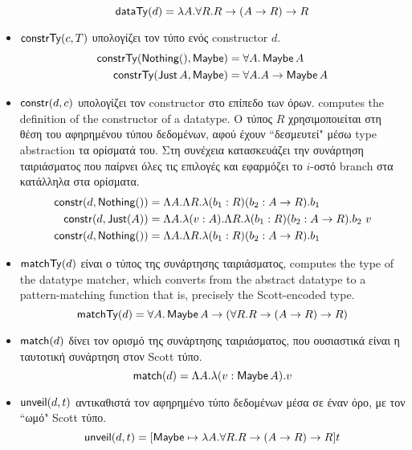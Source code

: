 \begin{itemize}
  $$\mathsf{dataTy}(d) = \lambda A . \forall R . R \rightarrow (A \rightarrow R) \rightarrow R$$
\item $\mathsf{constrTy}(c, T)$ υπολογίζει τον τύπο ενός constructor $d$.
  \begin{align*}
  \mathsf{constrTy}(\operatorname{\textsf{Nothing}} (), \operatorname{\textsf{Maybe}}) &= \forall A . \operatorname{\textsf{Maybe}} A\\
  \mathsf{constrTy}(\operatorname{\textsf{Just}} A, \operatorname{\textsf{Maybe}}) &= \forall A . A \rightarrow \operatorname{\textsf{Maybe}} A
  \end{align*}
\item $\mathsf{constr}(d, c)$ υπολογίζει τον constructor στο επίπεδο των όρων. computes the definition of the constructor of a datatype. Ο τύπος $R$ χρησιμοποιείται στη θέση του αφηρημένου τύπου δεδομένων,
 αφού έχουν ``δεσμευτεί" μέσω type abstraction τα ορίσματά του. Στη συνέχεια κατασκευάζει την συνάρτηση ταιριάσματος που παίρνει όλες τις επιλογές 
  και εφαρμόζει το $i$-οστό branch στα κατάλληλα στα ορίσματα.
  \begin{align*}
  \mathsf{constr}(d, \operatorname{\textsf{Nothing}} ()) &= \Lambda A . \Lambda R . \lambda (b_1 : R) (b_2 : A \rightarrow R) . b_1\\
  \mathsf{constr}(d, \operatorname{\textsf{Just}} (A)) &= \Lambda A . \lambda (v : A) . \Lambda R . \lambda (b_1 : R) (b_2 : A \rightarrow R) . b_2\ v\\
  \mathsf{constr}(d, \operatorname{\textsf{Nothing}} ()) &= \Lambda A . \Lambda R . \lambda (b_1 : R) (b_2 : A \rightarrow R) . b_1
  \end{align*}
\item $\mathsf{matchTy}(d)$ είναι ο τύπος της συνάρτησης ταιριάσματος, computes the type of the datatype matcher, which converts
  from the abstract datatype to a pattern-matching function \textemdash{} that
  is, precisely the Scott-encoded type.
  $$\mathsf{matchTy}(d) = \forall A . \operatorname{\textsf{Maybe}} A \rightarrow (\forall R . R \rightarrow (A \rightarrow R) \rightarrow R)$$
\item $\mathsf{match}(d)$ δίνει τον ορισμό της συνάρτησης ταιριάσματος, που ουσιαστικά είναι η ταυτοτική συνάρτηση στον Scott τύπο.
  $$\mathsf{match}(d) = \Lambda A . \lambda (v : \operatorname{\textsf{Maybe}} A) . v$$
\item $\mathsf{unveil}(d, t)$ αντικαθιστά τον αφηρημένο τύπο δεδομένων μέσα σε έναν όρο, με τον
``ωμό" Scott τύπο. 
  $$\mathsf{unveil}(d, t) = [\operatorname{\textsf{Maybe}} \mapsto \lambda A . \forall R . R \rightarrow (A \rightarrow R) \rightarrow R]t$$
\end{itemize}



